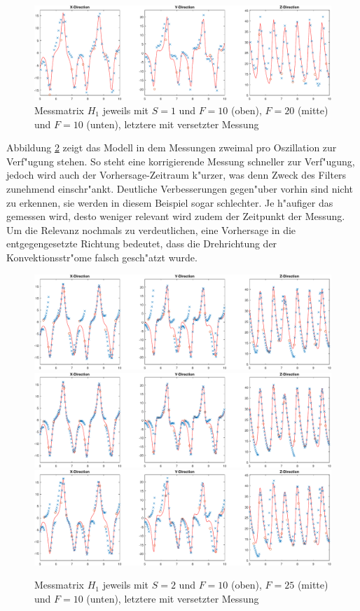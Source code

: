 \begin{refsection}
\begin{figure}
\includegraphics[width=\hsize]{kalman/figures/H1R10S1aS.pdf}
\caption{Messmatrix $H_{1}$ jeweils mit $S=1$ und $F=10$ (oben), $F=20$ (mitte) und $F=10$ (unten), letztere mit versetzter Messung}
\label{kalman:H1S1}
\end{figure}

Abbildung \ref{kalman:H1S2} zeigt das Modell in dem Messungen zweimal pro Oszillation zur Verf"ugung stehen. So steht eine korrigierende Messung schneller zur Verf"ugung, jedoch wird auch der Vorhersage-Zeitraum k"urzer, was denn Zweck des Filters zunehmend einschr"ankt. Deutliche Verbesserungen gegen"uber vorhin sind nicht zu erkennen, sie werden in diesem Beispiel sogar schlechter. Je h"aufiger das gemessen wird, desto weniger relevant wird zudem der Zeitpunkt der Messung.
Um die Relevanz nochmals zu verdeutlichen, eine Vorhersage in die entgegengesetzte Richtung bedeutet, dass die Drehrichtung  der Konvektionsstr"ome falsch gesch"atzt wurde.
\begin{figure}
\centering
\includegraphics[width=\hsize]{kalman/figures/H1R10S2.pdf}
\includegraphics[width=\hsize]{kalman/figures/H1R25S2.pdf}
\includegraphics[width=\hsize]{kalman/figures/H1R10S2aS.pdf}
\caption{Messmatrix $H_{1}$ jeweils mit $S=2$ und $F=10$ (oben), $F=25$ (mitte) und $F=10$ (unten), letztere mit versetzter Messung}
\label{kalman:H1S2}
\end{figure}


\end{refsection}

